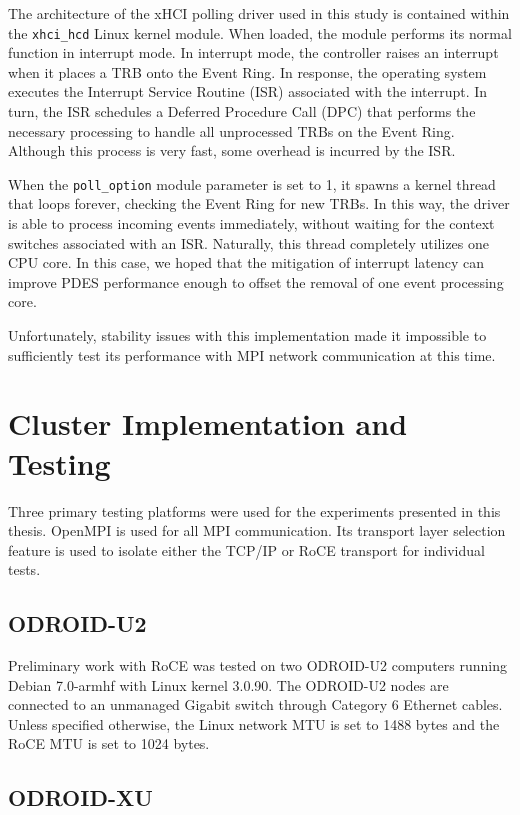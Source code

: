 \documentclass[11pt]{book}
\begin{document}
The architecture of the xHCI polling driver used in this study is contained within the
\verb;xhci_hcd; Linux kernel module.  When loaded, the module performs its normal function
in interrupt mode.  In interrupt mode, the controller raises an interrupt when it places a
TRB onto the Event Ring.  In response, the operating system executes the Interrupt Service
Routine (ISR) associated with the interrupt.  In turn, the ISR schedules a Deferred
Procedure Call (DPC) that performs the necessary processing to handle all unprocessed TRBs
on the Event Ring.  Although this process is very fast, some overhead is incurred by the
ISR.

When the \verb;poll_option; module parameter is set to 1, it spawns a kernel thread that
loops forever, checking the Event Ring for new TRBs.  In this way, the driver is able to
process incoming events immediately, without waiting for the context switches associated
with an ISR.  Naturally, this thread completely utilizes one CPU core.  In this case, we
hoped that the mitigation of interrupt latency can improve PDES performance enough to
offset the removal of one event processing core.

Unfortunately, stability issues with this implementation made it impossible to
sufficiently test its performance with MPI network communication at this time.

\chapter{Cluster Implementation and Testing}\label{cluster}

Three primary testing platforms were used for the experiments presented in this thesis.
OpenMPI is used for all MPI communication.  Its transport layer selection feature is used
to isolate either the TCP/IP or RoCE transport for individual tests.

\section{ODROID-U2}

Preliminary work with RoCE was tested on two ODROID-U2 computers running Debian 7.0-armhf
with Linux kernel 3.0.90.  The ODROID-U2 nodes are connected to an unmanaged Gigabit
switch through Category 6 Ethernet cables.  Unless specified otherwise, the Linux network
MTU is set to 1488 bytes and the RoCE MTU is set to 1024 bytes.

\section{ODROID-XU}
\end{document}
